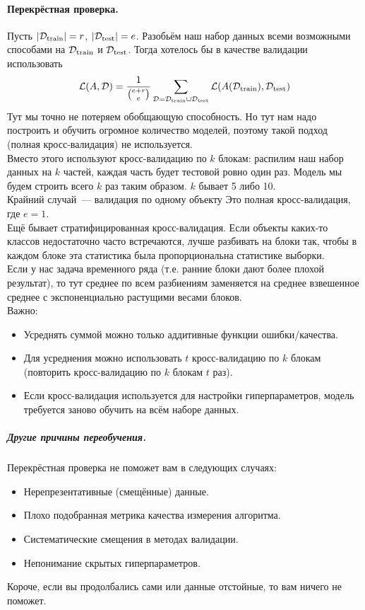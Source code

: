 \documentclass{article}
\begin{document}
    \paragraph{Перекрёстная проверка.}
    Пусть $|{\mathcal{D}}_{\mathrm{train}}|=r$, $|{\mathcal{D}}_{\mathrm{test}}|=e$. Разобьём наш набор данных всеми возможными способами на ${\mathcal{D}}_{\mathrm{train}}$ и ${\mathcal{D}}_{\mathrm{test}}$. Тогда хотелось бы в качестве валидации использовать
    \[
    {\mathcal{L}}(A,{\mathcal{D}})=\frac1{\binom{e+r}e}\sum\limits_{{\mathcal{D}}={\mathcal{D}}_{\mathrm{train}}\cup{\mathcal{D}}_{\mathrm{test}}}{\mathcal{L}}(A({\mathcal{D}}_{\mathrm{train}}),{\mathcal{D}}_{\mathrm{test}})
    \]
    Тут мы точно не потеряем обобщающую способность. Но тут нам надо построить и обучить огромное количество моделей, поэтому такой подход (полная кросс-валидация) не используется.\\
    Вместо этого используют кросс-валидацию по $k$ блокам: распилим наш набор данных на $k$ частей, каждая часть будет тестовой ровно один раз. Модель мы будем строить всего $k$ раз таким образом. $k$ бывает 5 либо 10.\\
    Крайний случай~--- валидация по одному объекту Это полная кросс-валидация, где $e=1$.\\
    Ещё бывает стратифицированная кросс-валидация. Если объекты каких-то классов недостаточно часто встречаются, лучше разбивать на блоки так, чтобы в каждом блоке эта статистика была пропорциональна статистике выборки.\\
    Если у нас задача временного ряда (т.е. ранние блоки дают более плохой результат), то тут среднее по всем разбиениям заменяется на среднее взвешенное среднее с экспоненциально растущими весами блоков.\\
    Важно:
    \begin{itemize}
        \item Усреднять суммой можно только аддитивные функции ошибки/качества.
        \item Для усреднения можно использовать $t$ кросс-валидацию по $k$ блокам (повторить кросс-валидацию по $k$ блокам $t$ раз).
        \item Если кросс-валидация используется для настройки гиперпараметров, модель требуется заново обучить на всём наборе данных.
    \end{itemize}
    \subparagraph{Другие причины переобучения.}
    Перекрёстная проверка не поможет вам в следующих случаях:
    \begin{itemize}
        \item Нерепрезентативные (смещённые) данные.
        \item Плохо подобранная метрика качества измерения алгоритма.
        \item Систематические смещения в методах валидации.
        \item Непонимание скрытых гиперпараметров.
    \end{itemize}
    Короче, если вы продолбались сами или данные отстойные, то вам ничего не поможет.
\end{document}
